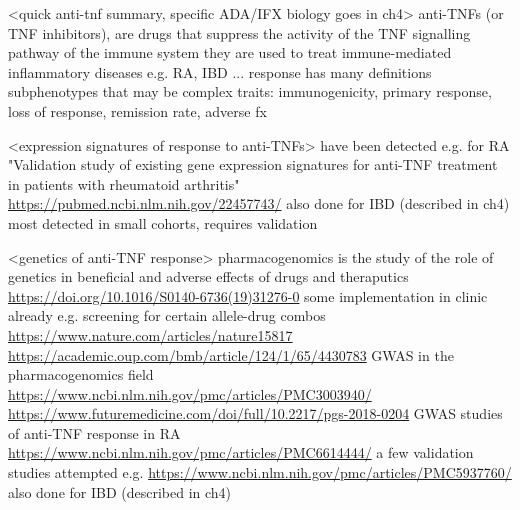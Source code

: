 \begin{outline}

\1 <quick anti-tnf summary, specific ADA/IFX biology goes in ch4>
    \2 anti-TNFs (or TNF inhibitors), are drugs that suppress the activity of the TNF signalling pathway of the immune system
    \2 they are used to treat immune-mediated inflammatory diseases e.g. RA, IBD ...
    \2 response has many definitions
        \3 subphenotypes that may be complex traits: immunogenicity, primary response, loss of response, remission rate, adverse fx


\1 <expression signatures of response to anti-TNFs>
    \2 have been detected e.g. for RA "Validation study of existing gene expression signatures for anti-TNF treatment in patients with rheumatoid arthritis" \url{https://pubmed.ncbi.nlm.nih.gov/22457743/}
    \2 also done for IBD (described in ch4)
    \2 most detected in small cohorts, requires validation

\1 <genetics of anti-TNF response>
    \2 pharmacogenomics is the study of the role of genetics in beneficial and adverse effects of drugs and theraputics \url{https://doi.org/10.1016/S0140-6736(19)31276-0}
    \2 some implementation in clinic already e.g. screening for certain allele-drug combos \url{https://www.nature.com/articles/nature15817} \url{https://academic.oup.com/bmb/article/124/1/65/4430783}
    \2 GWAS in the pharmacogenomics field \url{https://www.ncbi.nlm.nih.gov/pmc/articles/PMC3003940/} \url{https://www.futuremedicine.com/doi/full/10.2217/pgs-2018-0204}
    \2 GWAS studies of anti-TNF response in RA \url{https://www.ncbi.nlm.nih.gov/pmc/articles/PMC6614444/}
        \3 a few validation studies attempted e.g. \url{https://www.ncbi.nlm.nih.gov/pmc/articles/PMC5937760/}
    \2 also done for IBD (described in ch4)


\end{outline}
